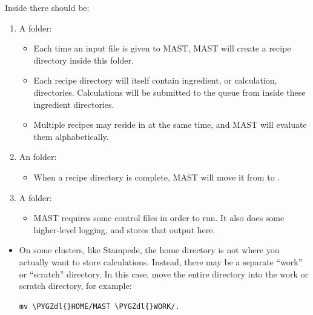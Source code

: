 \documentclass[letterpaper,10pt,english]{sphinxmanual}
\def\PYGZdl{\char`\$}
\begin{document}
Inside  there should be:
\begin{enumerate}
\item {} 
A  folder:
\begin{itemize}
\item {} 
Each time an input file is given to MAST, MAST will create a recipe directory inside this folder.

\item {} 
Each recipe directory will itself contain ingredient, or calculation, directories. Calculations will be submitted to the queue from inside these ingredient directories.

\item {} 
Multiple recipes may reside in  at the same time, and MAST will evaluate them alphabetically.

\end{itemize}

\item {} 
An  folder:
\begin{itemize}
\item {} 
When a recipe directory is complete, MAST will move it from  to .

\end{itemize}

\item {} 
A  folder:
\begin{itemize}
\item {} 
MAST requires some control files in order to run. It also does some higher-level logging, and stores that output here.

\end{itemize}

\end{enumerate}
\begin{itemize}
\item {} 
On some clusters, like Stampede, the home directory is not where you actually want to store calculations. Instead, there may be a separate ``work'' or ``scratch'' directory. In this case, move the entire  directory into the work or scratch directory, for example:

\begin{Verbatim}[commandchars=\\\{\}]
mv \PYGZdl{}HOME/MAST \PYGZdl{}WORK/.
\end{Verbatim}

\end{itemize}
\end{document}
